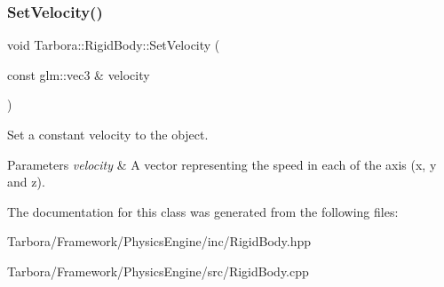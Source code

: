 \subsubsection{\texorpdfstring{Set\+Velocity()}{SetVelocity()}}
{\footnotesize\ttfamily void Tarbora\+::\+Rigid\+Body\+::\+Set\+Velocity (\begin{DoxyParamCaption}\item[{const glm\+::vec3 \&}]{velocity }\end{DoxyParamCaption})}



Set a constant velocity to the object. 


\begin{DoxyParams}{Parameters}
{\em velocity} & A vector representing the speed in each of the axis (x, y and z). \\
\hline
\end{DoxyParams}


The documentation for this class was generated from the following files\+:\begin{DoxyCompactItemize}
\item 
Tarbora/\+Framework/\+Physics\+Engine/inc/Rigid\+Body.\+hpp\item 
Tarbora/\+Framework/\+Physics\+Engine/src/Rigid\+Body.\+cpp\end{DoxyCompactItemize}
